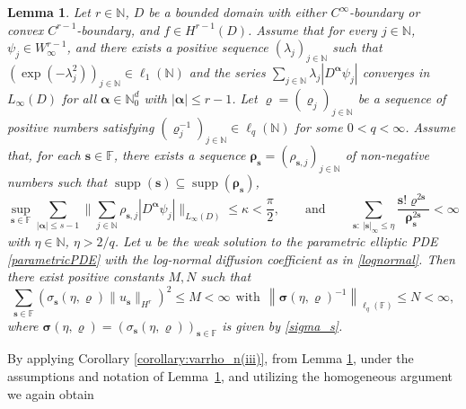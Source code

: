 \documentclass[11pt]{article}
\newtheorem{lemma}{Lemma}[section]
\numberwithin{equation}{section}
\theoremstyle{definition}
\theoremstyle{remark}
\newcommand{\brac}[1]{\left(#1\right)}
\newcommand{\norm}[2]{\left\|{#1}\right\|_{#2}}
\newcommand{\bs}{{\boldsymbol{s}}}
\newcommand{\brho}{{\boldsymbol{\rho}}}
\newcommand{\bvarrho}{{\boldsymbol{\varrho}}}
\newcommand{\bsigma}{{\boldsymbol{\sigma}}}
\newcommand{\balpha}{{\boldsymbol{\alpha}}}
\def\NN{{\mathbb N}}
\def\NN{{\mathbb N}}
\def\FF{{\mathcal F}}
\def\FF{{\mathcal F}}
\def\NN{{\mathbb N}}
\def\FF{{\mathbb F}}
\def\supp{\operatorname{supp}}
\begin{document}
{\begin{lemma} \label{lemma:H^r} 
Let $r \in \NN$, $D$ be a bounded domain with either $C^\infty$-boundary or convex $C^{r-1}$-boundary, {and $f \in H^{r-1}(D)$.}	Assume that for every $j\in \NN$, $\psi_j\in W^{r-1}_\infty$, and there
	exists a positive sequence $(\lambda_j)_{j\in \NN}$ such that
	$(\exp(-\lambda_j^2))_{j\in \NN}\in \ell_1(\NN)$ and the
	series $\sum_{j\in \NN}\lambda_j|D^{\balpha}\psi_j|$ converges in
	$L_\infty(D)$ for all $\balpha \in \NN_0^d$ with ${|\balpha| \le r -1}$.
	Let 
	$\bvarrho=(\varrho_j)_{j\in \NN}$
	be a sequence of positive numbers satisfying
	$(\varrho_j^{-1})_{j \in \NN}\in \ell_q(\NN)$ for some
	$0 < q < \infty$. Assume that, for each
	$\bs\in \FF$, there exists a sequence 
	$\brho_\bs= (\rho_{\bs,j})_{j \in \NN}$ of non-negative numbers such that
	$\supp(\bs)\subseteq \supp(\brho_\bs)$,
	\begin{equation} \label{assumption: theorem 3.1}
		\sup_{\bs\in \FF} \sum_{|\balpha| \le s -1}\Bigg\| \sum_{j\in
			\NN}\rho_{\bs,j}|D^{\balpha}\psi_j|\Bigg\|_{L_\infty(D)}\leq
		\kappa <\frac{\pi}{2}, \qquad \text{and} \qquad
		\sum_{\bs: \ |\bs|_\infty\leq \eta}
		\frac{\bs!\bvarrho^{2\bs}}{\brho_\bs^{2\bs}}
		<\infty
	\end{equation} 
	with $\eta \in \NN$, $\eta > 2/q$. {Let  $u$ be the weak solution to the parametric elliptic PDE \eqref{parametricPDE}  with the log-normal diffusion coefficient as in \eqref{lognormal}.}
    Then there exist positive constants $M,N$ such that
	\begin{equation} \label{eq:beta-u} 
		\sum_{\bs\in\FF} \brac{\sigma_\bs(\eta,\bvarrho)\|u_\bs\|_{H^r}}^2 \le M <\infty \ \ \text{with} \ \
		\norm{\bsigma(\eta,\bvarrho)^{-1}}{\ell_q(\FF)} \le N < \infty,		
	\end{equation}
    where
    $\bsigma(\eta,\bvarrho)=(\sigma_\bs(\eta,\bvarrho))_{\bs \in \FF}$ is given by \eqref{sigma_s}.
\end{lemma}

By applying Corollary \ref{corollary:varrho_n(iii)}, from Lemma \ref{lemma:H^r}, under the assumptions and notation of Lemma~\ref{lemma:H^r}, and utilizing the homogeneous argument we again obtain 

}
\end{document}
